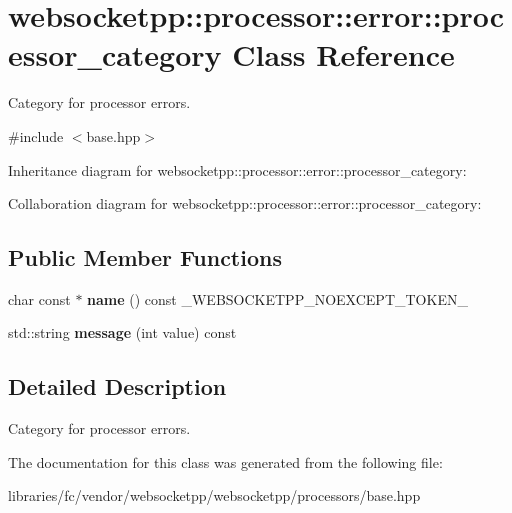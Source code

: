 \hypertarget{classwebsocketpp_1_1processor_1_1error_1_1processor__category}{}\section{websocketpp\+:\+:processor\+:\+:error\+:\+:processor\+\_\+category Class Reference}
\label{classwebsocketpp_1_1processor_1_1error_1_1processor__category}


Category for processor errors.  




{\ttfamily \#include $<$base.\+hpp$>$}



Inheritance diagram for websocketpp\+:\+:processor\+:\+:error\+:\+:processor\+\_\+category\+:


Collaboration diagram for websocketpp\+:\+:processor\+:\+:error\+:\+:processor\+\_\+category\+:
\subsection*{Public Member Functions}
\begin{DoxyCompactItemize}
\item 
\mbox{\label{classwebsocketpp_1_1processor_1_1error_1_1processor__category_a587e3e9c5c86807a6ca0d15505e34486}} 
char const  $\ast$ {\bfseries name} () const \+\_\+\+W\+E\+B\+S\+O\+C\+K\+E\+T\+P\+P\+\_\+\+N\+O\+E\+X\+C\+E\+P\+T\+\_\+\+T\+O\+K\+E\+N\+\_\+
\item 
\mbox{\label{classwebsocketpp_1_1processor_1_1error_1_1processor__category_af6c2ca60e45593c3fdc33eea8d711c34}} 
std\+::string {\bfseries message} (int value) const
\end{DoxyCompactItemize}


\subsection{Detailed Description}
Category for processor errors. 

The documentation for this class was generated from the following file\+:\begin{DoxyCompactItemize}
\item 
libraries/fc/vendor/websocketpp/websocketpp/processors/base.\+hpp\end{DoxyCompactItemize}
